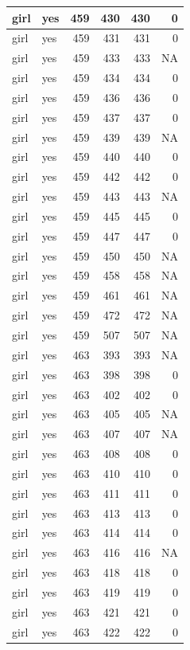 \documentclass[man]{apa6}
\begin{document}
\begin{tabular}{l|l|r|r|r|r}
\hline
girl & yes & 459 & 430 & 430 & 0\\
\hline
girl & yes & 459 & 431 & 431 & 0\\
\hline
girl & yes & 459 & 433 & 433 & NA\\
\hline
girl & yes & 459 & 434 & 434 & 0\\
\hline
girl & yes & 459 & 436 & 436 & 0\\
\hline
girl & yes & 459 & 437 & 437 & 0\\
\hline
girl & yes & 459 & 439 & 439 & NA\\
\hline
girl & yes & 459 & 440 & 440 & 0\\
\hline
girl & yes & 459 & 442 & 442 & 0\\
\hline
girl & yes & 459 & 443 & 443 & NA\\
\hline
girl & yes & 459 & 445 & 445 & 0\\
\hline
girl & yes & 459 & 447 & 447 & 0\\
\hline
girl & yes & 459 & 450 & 450 & NA\\
\hline
girl & yes & 459 & 458 & 458 & NA\\
\hline
girl & yes & 459 & 461 & 461 & NA\\
\hline
girl & yes & 459 & 472 & 472 & NA\\
\hline
girl & yes & 459 & 507 & 507 & NA\\
\hline
girl & yes & 463 & 393 & 393 & NA\\
\hline
girl & yes & 463 & 398 & 398 & 0\\
\hline
girl & yes & 463 & 402 & 402 & 0\\
\hline
girl & yes & 463 & 405 & 405 & NA\\
\hline
girl & yes & 463 & 407 & 407 & NA\\
\hline
girl & yes & 463 & 408 & 408 & 0\\
\hline
girl & yes & 463 & 410 & 410 & 0\\
\hline
girl & yes & 463 & 411 & 411 & 0\\
\hline
girl & yes & 463 & 413 & 413 & 0\\
\hline
girl & yes & 463 & 414 & 414 & 0\\
\hline
girl & yes & 463 & 416 & 416 & NA\\
\hline
girl & yes & 463 & 418 & 418 & 0\\
\hline
girl & yes & 463 & 419 & 419 & 0\\
\hline
girl & yes & 463 & 421 & 421 & 0\\
\hline
girl & yes & 463 & 422 & 422 & 0\\

\end{tabular}
\end{document}
